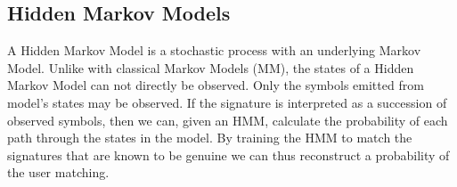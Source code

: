 \documentclass[a4paper, oneside]{csthesis}
\begin{document}







\subsection{Hidden Markov Models}


A Hidden Markov Model is a stochastic process with an underlying Markov Model.
Unlike with classical Markov Models (MM), the states of a Hidden Markov Model can not directly be observed. Only the symbols emitted from model's states may be observed. If the signature is interpreted as a succession of observed symbols, then we can, given an HMM, calculate the probability of each path through the states in the model. By training the HMM to match the signatures that are known to be genuine we can thus reconstruct a probability of the user matching.
\end{document}
